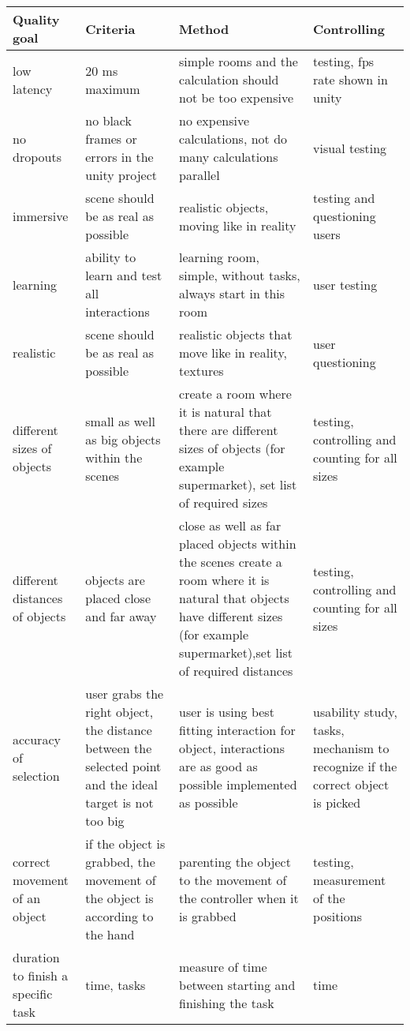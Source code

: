 \documentclass[a4paper, 12pt]{article}
\newcommand{\changefont}[3]{
\fontfamily{#1} \fontseries{#2} \fontshape{#3} \selectfont}
\begin{document}


\newpage
\begin{tabular}{| p{}| p{}| p{}| p{} |}
	\hline 
	\textbf{Quality goal} &	\textbf{Criteria} & \textbf{Method} & \textbf{Controlling} \\ \hline \hline
low latency & 20 ms maximum & simple rooms and the calculation should not be too expensive & testing, fps rate shown in unity \\ \hline
no dropouts & no black frames or errors in the unity project & no expensive calculations, not do many calculations parallel & visual testing  \\ \hline
immersive & scene should be as real as possible & realistic objects, moving like in reality & testing and questioning users\\ \hline  
learning & ability to learn and test all interactions & learning room, simple, without tasks, always start in this room & user testing \\ \hline
realistic & scene should be as real as possible & realistic objects that move like in reality, textures & user questioning \\ \hline  
different sizes of objects & small as well as big objects within the scenes & create a room where it is natural that there are different sizes of objects (for example supermarket), set list of required sizes & testing, controlling and counting for all sizes \\ \hline  
different distances of objects & objects are placed close and far away & close as well as far placed objects within the scenes create a room where it is natural that objects have different sizes (for example supermarket),set list of required distances & testing, controlling and counting for all sizes \\ \hline
accuracy of selection & user grabs the right object, the distance between the selected point and the ideal target is not too big & user is using best fitting interaction for object, interactions are as good as possible implemented as possible & usability study, tasks, mechanism to recognize if the correct object is picked \\ \hline  
correct movement of an object & if the object is grabbed, the movement of the object is according to the hand & parenting the object to the movement of the controller when it is grabbed & testing, measurement of the positions\\ \hline 
duration to finish a specific task & time, tasks & measure of time between starting and finishing the task & time \\ \hline  
\end{tabular}
\end{document}
